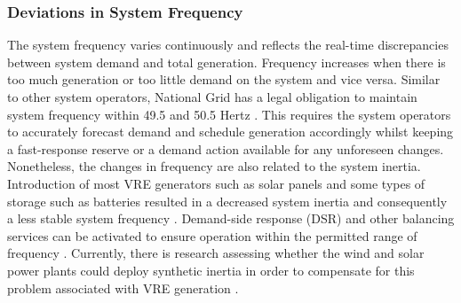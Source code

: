 \documentclass[energies,article,submit,moreauthors,pdftex]{Definitions/mdpi}
\begin{document}



\subsubsection{Deviations in  System Frequency}

The system frequency varies continuously and reflects the real-time discrepancies between system demand and total generation. Frequency increases when there is too much generation or too little demand on the system and vice versa.
Similar to other system operators, National Grid has a legal obligation to maintain system frequency within 49.5 and 50.5 Hertz \cite{ELEXON2020ELEXONBMRS}. This requires the system operators to accurately forecast demand and schedule generation accordingly whilst keeping a fast-response reserve or a demand action available for any unforeseen changes.
Nonetheless, the changes in frequency are also related to the system inertia. Introduction of most VRE generators such as solar panels and some types of storage such as batteries resulted in a decreased system inertia and consequently a less stable system frequency \cite{Ela2011OperatingReserves.}. Demand-side response (DSR) and other balancing services can be activated to ensure operation within the permitted range of frequency \cite{Nationalgrid2018BalancingStatement}. Currently, there is research assessing whether the wind and solar power plants could deploy synthetic inertia in order to compensate for this problem associated with VRE generation \cite{Hansen2014AnalysisTurbines, Zeni2013VirtualTurbines, Liu2017PV-basedSystem}. 
\end{document}
